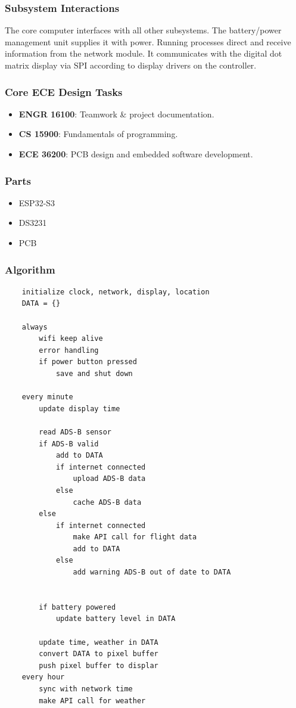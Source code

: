 \subsubsection{Subsystem Interactions}
The core computer interfaces with
all other subsystems. The battery/power
management unit supplies it with power.
Running processes direct and receive
information from the network module.
It communicates with the digital dot matrix
display via SPI according to display
drivers on the controller.


\subsubsection{Core ECE Design Tasks}
\begin{itemize}
    \item \textbf{ENGR 16100}: Teamwork \& project documentation.
    \item \textbf{CS 15900}: Fundamentals of programming.
    \item \textbf{ECE 36200}: PCB design and embedded software development.
\end{itemize}

\subsubsection{Parts}
\begin{itemize}
    \item ESP32-S3
    \item DS3231
    \item PCB
\end{itemize}

\subsubsection{Algorithm}
\begin{lstlisting}
    initialize clock, network, display, location
    DATA = {}

    always 
        wifi keep alive
        error handling
        if power button pressed
            save and shut down
    
    every minute
        update display time

        read ADS-B sensor
        if ADS-B valid
            add to DATA
            if internet connected
                upload ADS-B data
            else
                cache ADS-B data
        else 
            if internet connected
                make API call for flight data
                add to DATA
            else
                add warning ADS-B out of date to DATA
            

        if battery powered
            update battery level in DATA

        update time, weather in DATA
        convert DATA to pixel buffer
        push pixel buffer to displar
    every hour
        sync with network time
        make API call for weather

\end{lstlisting}

